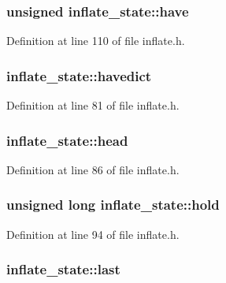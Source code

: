 \hypertarget{structinflate__state_a4a2b15912256bcf7b39980e15095ba58}{
\subsubsection[{have}]{\setlength{\rightskip}{0pt plus 5cm}unsigned inflate\-\_\-state\-::have}}\label{structinflate__state_a4a2b15912256bcf7b39980e15095ba58}


Definition at line 110 of file inflate.\-h.

\hypertarget{structinflate__state_a2eb1cd634ed6baade952ffa5938ebcdc}{
\subsubsection[{havedict}]{ inflate\-\_\-state\-::havedict}}\label{structinflate__state_a2eb1cd634ed6baade952ffa5938ebcdc}


Definition at line 81 of file inflate.\-h.

\hypertarget{structinflate__state_aac35b33a559009eb4bc0e2bdd8e9b5c6}{
\subsubsection[{head}]{ inflate\-\_\-state\-::head}}\label{structinflate__state_aac35b33a559009eb4bc0e2bdd8e9b5c6}


Definition at line 86 of file inflate.\-h.

\hypertarget{structinflate__state_a5a91b1c59e52f1aa7eda75b86b05b843}{
\subsubsection[{hold}]{\setlength{\rightskip}{0pt plus 5cm}unsigned {\bf long} inflate\-\_\-state\-::hold}}\label{structinflate__state_a5a91b1c59e52f1aa7eda75b86b05b843}


Definition at line 94 of file inflate.\-h.

\hypertarget{structinflate__state_ab3cbcd2c5ff3b0b8b34ef402a13afdf7}{
\subsubsection[{last}]{ inflate\-\_\-state\-::last}}\label{structinflate__state_ab3cbcd2c5ff3b0b8b34ef402a13afdf7}


